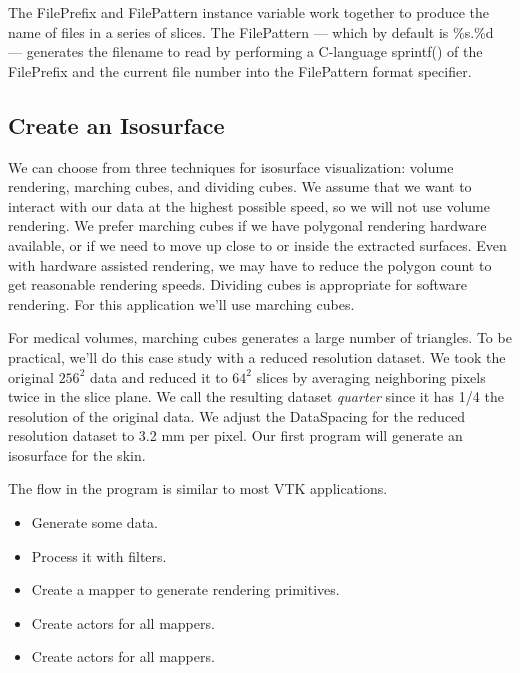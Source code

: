 The FilePrefix and FilePattern instance variable work together to produce the name of files in a series of slices. The FilePattern --- which by default is \%s.\%d --- generates the filename to read by performing a C-language sprintf() of the FilePrefix and the current file number into the FilePattern format specifier.

\subsection{Create an Isosurface}

We can choose from three techniques for isosurface visualization: volume rendering, marching cubes, and dividing cubes. We assume that we want to interact with our data at the highest possible speed, so we will not use volume rendering. We prefer marching cubes if we have polygonal rendering hardware available, or if we need to move up close to or inside the extracted surfaces. Even with hardware assisted rendering, we may have to reduce the polygon count to get reasonable rendering speeds. Dividing cubes is appropriate for software rendering. For this application we'll use marching cubes.

For medical volumes, marching cubes generates a large number of triangles. To be practical,  we'll do this case study with a reduced resolution dataset. We took the original $256^2$ data and reduced it to $64^2$ slices by averaging neighboring pixels twice in the slice plane. We call the resulting dataset \emph{quarter} since it has 1/4 the resolution of the original data. We adjust the DataSpacing for the reduced resolution dataset to 3.2 mm per pixel. Our first program will generate an isosurface for the skin.

The flow in the program is similar to most VTK applications.

\begin{itemize}

	\item Generate some data.

	\item Process it with filters.

	\item Create a mapper to generate rendering primitives.

	\item Create actors for all mappers.

	\item Create actors for all mappers.

\end{itemize}


